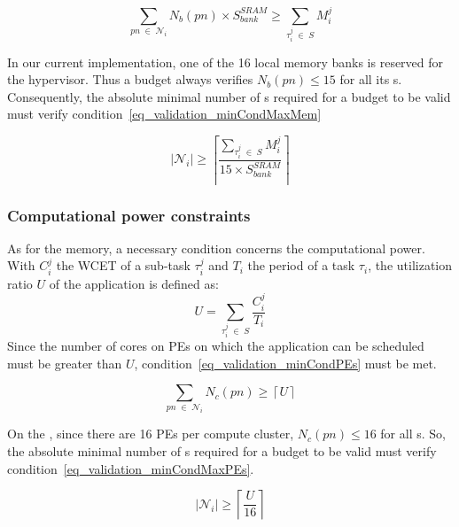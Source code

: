 \documentclass[main.tex]{subfiles}
\begin{document}
\begin{equation}
    \underset{pn \; \in \; \mathcal{N}_i}{\sum} N_b(pn) \times S_{bank}^{SRAM} \geq
    \underset{\tau_i^j \; \in \; S}{\sum} M_i^j
    \label{eq_validation_minCondMem}
\end{equation}

In our current implementation, one of the 16 local memory banks is reserved for the hypervisor. Thus a budget always verifies $N_b(pn) \leq 15$ for all its \PN{}s. Consequently, the absolute minimal number of \PN{}s required for a budget to be valid must verify condition~\ref{eq_validation_minCondMaxMem}

\begin{equation}
    | \mathcal{N}_i | \geq 
    \left\lceil \dfrac{  \underset{\tau_i^j \; \in \; S}{\sum} M_i^j }{15 \times  S_{bank}^{SRAM}} \right\rceil
    \label{eq_validation_minCondMaxMem}
\end{equation}

\subsubsection{Computational power constraints}
As for the memory, a necessary condition concerns the computational power. With $C_i^j$ the WCET of a sub-task $\tau_i^j$ and $T_i$ the period of a task $\tau_i$, the utilization ratio $U$ of the application is defined as:
\begin{displaymath}
    U = \underset{\tau_i^j \; \in \; S}{\sum} \dfrac{C_i^j}{T_i}
\end{displaymath}
Since the number of cores on PEs on which the application can be scheduled must be greater than $U$, condition~\ref{eq_validation_minCondPEs} must be met.

\begin{equation}
    \underset{pn \; \in \; \mathcal{N}_i}{\sum} N_c(pn) \geq \left\lceil U \right\rceil
    \label{eq_validation_minCondPEs}
\end{equation}

On the \mppalong, since there are 16 PEs per compute cluster, $N_c(pn) \leq 16$ for all \PN{}s. So, the absolute minimal number of \PN{}s required for a budget to be valid must verify condition~\ref{eq_validation_minCondMaxPEs}.

\begin{equation}
    | \mathcal{N}_i | \geq \left\lceil \dfrac{U}{16} \right\rceil
    \label{eq_validation_minCondMaxPEs}
\end{equation}
\end{document}
